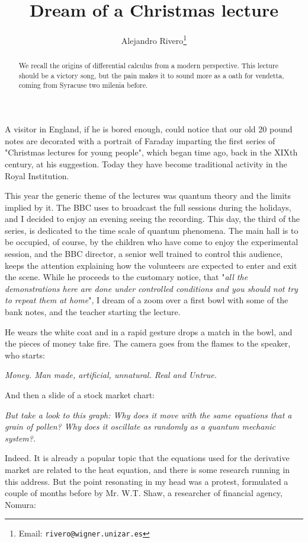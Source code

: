 \documentclass[a4paper,10pt]{article}
\begin{document}
\title{Dream of a Christmas lecture}
\author{Alejandro Rivero\thanks{ 
Email: \tt rivero@wigner.unizar.es}}
\maketitle
\begin{abstract}
We recall the origins of differential calculus from a modern perspective. 
This lecture should be a victory song, but the pain makes it to sound more as a
oath for vendetta, coming from Syracuse two milenia before.
\end{abstract}

A visitor in England, if he is bored enough, could notice that our
old 20 pound notes are
decorated with a portrait of Faraday  
imparting the first series of "Christmas 
lectures for young people", which
began time ago, back in the XIXth century, at his suggestion. Today they
have become
traditional activity in the Royal Institution. 

This year the generic theme of the lectures was quantum theory and the 
limits implied by it. The BBC uses to broadcast the full sessions during
the holidays, and I decided to enjoy an evening seeing the recording.
This day, the third of the series, is dedicated to the time scale
of quantum phenomena. The main hall is to be occupied,
of course, by the children who have come to enjoy the experimental
session, and the BBC director, a senior well trained to control
this audience, keeps the attention explaining how the volunteers
are expected to enter and exit the scene. While he proceeds
to the customary notice, that "{\it all the demonstrations here are done
under controlled conditions and you should not try to repeat
them at home}", I dream of a zoom over a first bowl with some
of the bank notes, and the teacher starting the lecture.

He wears the white coat and in a rapid gesture drops a match in
the bowl, and the pieces of money take fire. The camera goes
from the flames to the speaker, who starts:

{\it Money. Man made, artificial, unnatural. Real and Untrue.} 

And then a slide of a stock market chart:

{\it But take a look
to this graph: Why does it move with the same equations that a
grain of pollen? Why does it oscillate as randomly as a quantum
mechanic system?}.

Indeed. It is already a popular topic that the equations used for the
derivative market are related to the heat equation, and there is
some research running in this address. But the point resonating in
my head was a protest, formulated\cite{shaw} a couple of months before by
Mr. W.T. Shaw, a researcher of financial agency, Nomura: 
\end{document}
